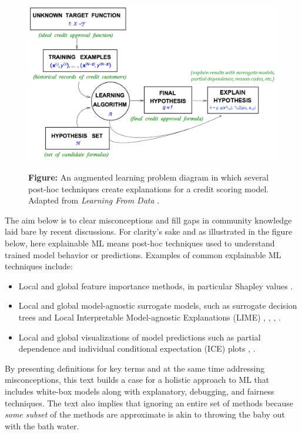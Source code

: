 \documentclass{article}
\begin{document}
\begin{figure}[htb]
	\begin{center}
		\includegraphics[scale=0.33]{img/figure_1.png}
		\label{fig:learning_problem}
		\captionsetup{labelformat=empty}
		\caption{\textbf{Figure:} An augmented learning problem diagram in which several post-hoc techniques create explanations for a credit scoring model. Adapted from \textit{Learning From Data} \cite{lfd}.}
	\end{center}
\end{figure}	

The aim below is to clear misconceptions and fill gaps in community knowledge laid bare by recent discussions. For clarity's sake and as illustrated in the figure below, here explainable ML means post-hoc techniques used to understand trained model behavior or predictions. Examples of common explainable ML techniques include:

\begin{itemize}
\item Local and global feature importance methods, in particular Shapley values \cite{shapley}.
\item Local and global model-agnostic surrogate models, such as surrogate decision trees and Local Interpretable Model-agnostic Explanations (LIME) \cite{dt_surrogate1}, \cite{dt_surrogate2}, \cite{lime-sup}, \cite{lime}. 
\item Local and global visualizations of model predictions such as partial dependence and individual conditional expectation (ICE) plots \cite{esl}, \cite{ice_plots}.
\end{itemize}

By presenting definitions for key terms and at the same time addressing misconceptions, this text builds a case for a holistic approach to ML that includes white-box models along with explanatory, debugging, and fairness techniques. The text also implies that ignoring an entire set of methods because \textit{some subset} of the methods are approximate is akin to throwing the baby out with the bath water. 
\end{document}
